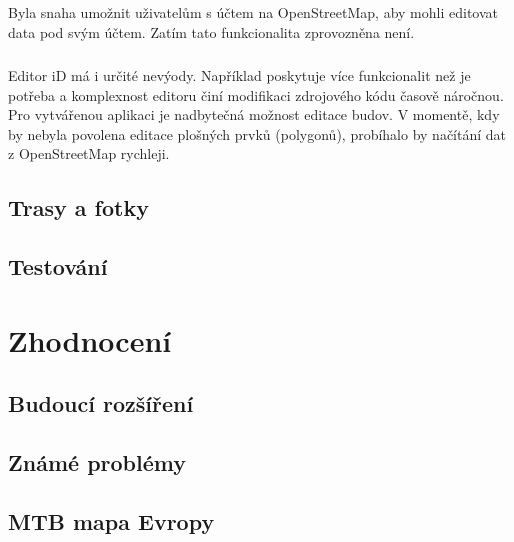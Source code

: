 \documentclass[11pt,a4paper,titlepage,oneside]{book}
\begin{document}
				\paragraph{}{\Large Byla snaha umožnit uživatelům s účtem na OpenStreetMap, aby mohli editovat data pod svým účtem. Zatím tato funkcionalita zprovozněna není.}
				\paragraph{} Editor iD má i určité nevýody. Například poskytuje více funkcionalit než je potřeba a komplexnost editoru činí modifikaci zdrojového kódu časově náročnou. Pro vytvářenou aplikaci je nadbytečná možnost editace budov. V momentě, kdy by nebyla povolena editace plošných prvků (polygonů), probíhalo by načítání dat z OpenStreetMap rychleji. 
		\section{Trasy a fotky}
			\paragraph{}

		\section{Testování}


	\chapter{Zhodnocení}
		\section{Budoucí rozšíření}

		\section{Známé problémy}

		\section{MTB mapa Evropy}
\end{document}
